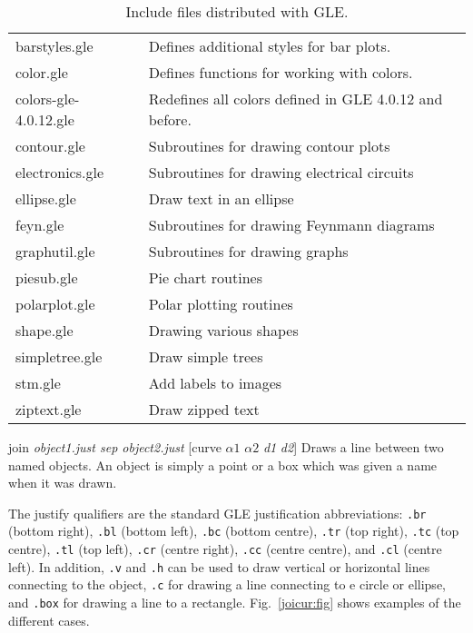\begin{commanddescription}
\begin{table}[t]
\centering
\caption{\label{inc:tab}Include files distributed with GLE.}
\begin{tabular}{ll} \hline
barstyles.gle             & Defines additional styles for bar plots.\\
color.gle                 & Defines functions for working with colors.\\
colors-gle-4.0.12.gle     & Redefines all colors defined in GLE 4.0.12 and before.\\
contour.gle               & Subroutines for drawing contour plots\\
electronics.gle           & Subroutines for drawing electrical circuits\\
ellipse.gle               & Draw text in an ellipse\\
feyn.gle                  & Subroutines for drawing Feynmann diagrams\\
graphutil.gle             & Subroutines for drawing graphs\\
piesub.gle                & Pie chart routines\\
polarplot.gle             & Polar plotting routines\\
shape.gle                 & Drawing various shapes\\
simpletree.gle            & Draw simple trees\\
stm.gle                   & Add labels to images\\
ziptext.gle               & Draw zipped text\\ \hline
\end{tabular}
\end{table}


\item[{\sf join {\it object1.just sep object2.just} [curve {\it $\alpha1$} {\it $\alpha2$} {\it d1} {\it d2}]}]
\label{cmd:join}
Draws a line between two named objects. An object is simply a point or a box which was given a name when it was drawn.

The justify qualifiers are the standard GLE justification abbreviations: \verb#.br# (bottom right), \verb#.bl# (bottom left), \verb#.bc# (bottom centre), \verb#.tr# (top right), \verb#.tc# (top centre), \verb#.tl# (top left), \verb#.cr# (centre right), \verb#.cc# (centre centre), and \verb#.cl# (centre left). In addition, \verb#.v# and \verb#.h# can be used to draw vertical or horizontal lines connecting to the object, \verb#.c# for drawing a line connecting to e circle or ellipse, and \verb#.box# for drawing a line to a rectangle. Fig.~\ref{joicur:fig} shows examples of the different cases.


\end{commanddescription}
